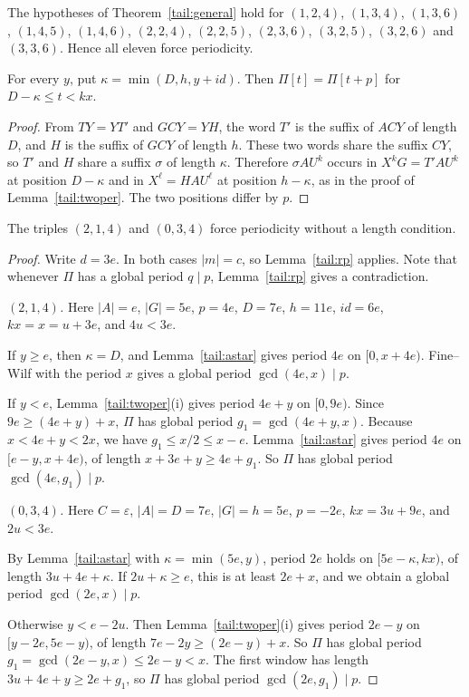 \begin{corollary}\label{tail:gencor}
The hypotheses of Theorem~\ref{tail:general} hold for \((1,2,4)\), \((1,3,4)\), \((1,3,6)\), \((1,4,5)\), \((1,4,6)\), \((2,2,4)\), \((2,2,5)\), \((2,3,6)\), \((3,2,5)\), \((3,2,6)\) and \((3,3,6)\). Hence all eleven force periodicity.
\end{corollary}

\begin{lemma}\label{tail:astar}
For every \(y\), put \(\kappa=\min(D,h,y+id)\). Then \(\Pi[t]=\Pi[t+p]\) for \(D-\kappa\le t<kx\).
\end{lemma}
\begin{proof}
From \(TY=YT'\) and \(GCY=YH\), the word \(T'\) is the suffix of \(ACY\) of length \(D\), and \(H\) is the suffix of \(GCY\) of length \(h\). These two words share the suffix \(CY\), so \(T'\) and \(H\) share a suffix \(\sigma\) of length \(\kappa\). Therefore \(\sigma AU^k\) occurs in \(X^kG=T'AU^k\) at position \(D-\kappa\) and in \(X^\ell=HAU^\ell\) at position \(h-\kappa\), as in the proof of Lemma~\ref{tail:twoper}. The two positions differ by \(p\).
\end{proof}

\begin{theorem}\label{tail:214}
The triples \((2,1,4)\) and \((0,3,4)\) force periodicity without a length condition.
\end{theorem}
\begin{proof}
Write \(d=3e\). In both cases \(|m|=c\), so Lemma~\ref{tail:rp} applies. Note that whenever \(\Pi\) has a global period \(q\mid p\), Lemma~\ref{tail:rp} gives a contradiction.

\emph{\((2,1,4)\).} Here \(|A|=e\), \(|G|=5e\), \(p=4e\), \(D=7e\), \(h=11e\), \(id=6e\), \(kx=x=u+3e\), and \(4u<3e\).

If \(y\ge e\), then \(\kappa=D\), and Lemma~\ref{tail:astar} gives period \(4e\) on \([0,x+4e)\). Fine--Wilf with the period \(x\) gives a global period \(\gcd(4e,x)\mid p\).

If \(y<e\), Lemma~\ref{tail:twoper}(i) gives period \(4e+y\) on \([0,9e)\). Since \(9e\ge(4e+y)+x\), \(\Pi\) has global period \(g_1=\gcd(4e+y,x)\). Because \(x<4e+y<2x\), we have \(g_1\le x/2\le x-e\). Lemma~\ref{tail:astar} gives period \(4e\) on \([e-y,x+4e)\), of length \(x+3e+y\ge4e+g_1\). So \(\Pi\) has global period \(\gcd(4e,g_1)\mid p\).

\emph{\((0,3,4)\).} Here \(C=\varepsilon\), \(|A|=D=7e\), \(|G|=h=5e\), \(p=-2e\), \(kx=3u+9e\), and \(2u<3e\).

By Lemma~\ref{tail:astar} with \(\kappa=\min(5e,y)\), period \(2e\) holds on \([5e-\kappa,kx)\), of length \(3u+4e+\kappa\). If \(2u+\kappa\ge e\), this is at least \(2e+x\), and we obtain a global period \(\gcd(2e,x)\mid p\).

Otherwise \(y<e-2u\). Then Lemma~\ref{tail:twoper}(i) gives period \(2e-y\) on \([y-2e,5e-y)\), of length \(7e-2y\ge(2e-y)+x\). So \(\Pi\) has global period \(g_1=\gcd(2e-y,x)\le2e-y<x\). The first window has length \(3u+4e+y\ge2e+g_1\), so \(\Pi\) has global period \(\gcd(2e,g_1)\mid p\).
\end{proof}

